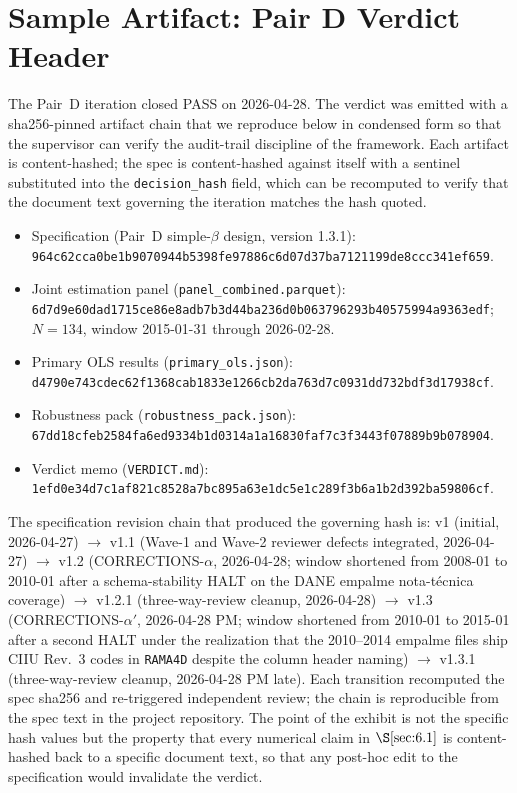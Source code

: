 \section{Sample Artifact: Pair D Verdict Header}\label{app:C}

The Pair~D iteration closed PASS on 2026-04-28. The verdict was
emitted with a sha256-pinned artifact chain that we reproduce below in
condensed form so that the supervisor can verify the audit-trail
discipline of the framework. Each artifact is content-hashed; the
spec is content-hashed against itself with a sentinel substituted into
the \texttt{decision\_hash} field, which can be recomputed to verify
that the document text governing the iteration matches the hash quoted.

\begin{itemize}
  \item Specification (Pair~D simple-\(\beta\) design, version 1.3.1):
    \texttt{964c62cca0be1b9070944b5398fe97886c6d07d37ba7121199de8ccc341ef659}.
  \item Joint estimation panel (\texttt{panel\_combined.parquet}):
    \texttt{6d7d9e60dad1715ce86e8adb7b3d44ba236d0b063796293b40575994a9363edf};
    \(N = 134\), window 2015-01-31 through 2026-02-28.
  \item Primary OLS results (\texttt{primary\_ols.json}):
    \texttt{d4790e743cdec62f1368cab1833e1266cb2da763d7c0931dd732bdf3d17938cf}.
  \item Robustness pack (\texttt{robustness\_pack.json}):
    \texttt{67dd18cfeb2584fa6ed9334b1d0314a1a16830faf7c3f3443f07889b9b078904}.
  \item Verdict memo (\texttt{VERDICT.md}):
    \texttt{1efd0e34d7c1af821c8528a7bc895a63e1dc5e1c289f3b6a1b2d392ba59806cf}.
\end{itemize}

The specification revision chain that produced the governing hash is:
v1 (initial, 2026-04-27) \(\to\) v1.1 (Wave-1 and Wave-2 reviewer
defects integrated, 2026-04-27) \(\to\) v1.2 (CORRECTIONS-\(\alpha\),
2026-04-28; window shortened from 2008-01 to 2010-01 after a
schema-stability HALT on the DANE empalme nota-técnica coverage)
\(\to\) v1.2.1 (three-way-review cleanup, 2026-04-28) \(\to\) v1.3
(CORRECTIONS-\(\alpha'\), 2026-04-28 PM; window shortened from
2010-01 to 2015-01 after a second HALT under the realization that the
2010--2014 empalme files ship CIIU Rev.~3 codes in
\texttt{RAMA4D} despite the column header naming) \(\to\) v1.3.1
(three-way-review cleanup, 2026-04-28 PM late). Each transition
recomputed the spec sha256 and re-triggered independent review; the
chain is reproducible from the spec text in the project repository.
The point of the exhibit is not the specific hash values but the
property that every numerical claim in \(\S\ref{sec:6.1}\) is
content-hashed back to a specific document text, so that any
post-hoc edit to the specification would invalidate the verdict.
